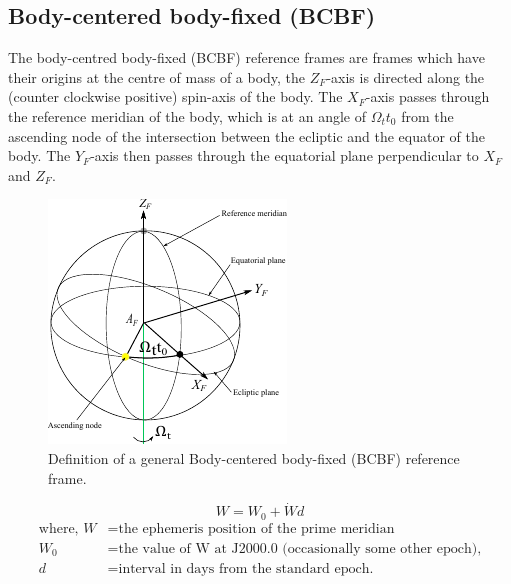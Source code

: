 \subsection{Body-centered body-fixed (BCBF)\label{ssec:frame_bcbf}}

The body-centred body-fixed (BCBF) reference frames are frames which have their origins at the centre of mass of a body, the $Z_F$-axis is directed along the (counter clockwise positive) spin-axis of the body. The $X_F$-axis passes through the reference meridian of the body, which is at an angle of $\Omega_t{t_0}$ from the ascending node of the intersection between the ecliptic and the equator of the body. The $Y_F$-axis then passes through the equatorial plane perpendicular to $X_F$ and $Z_F$.

\begin{figure}[H]
    \centering
    \includegraphics[width=0.35\linewidth]{graphics/bcbf.pdf}
    \caption{
        Definition of a general Body-centered body-fixed (BCBF) reference frame.
    }
    \label{fig:bci}
\end{figure}


\begin{equation}
    W = W_0 + \dot{W}d
    \label{eq:ephem_prime_meridian}
\end{equation}
\begin{equation*}
    \begin{aligned}
        \textrm{where, }
        W   & = \textrm{the ephemeris position of the prime meridian}               \\
        W_0 & = \textrm{the value of W at J2000.0 (occasionally some other epoch),} \\
        d   & = \textrm{interval in days from the standard epoch.}
    \end{aligned}
\end{equation*}

